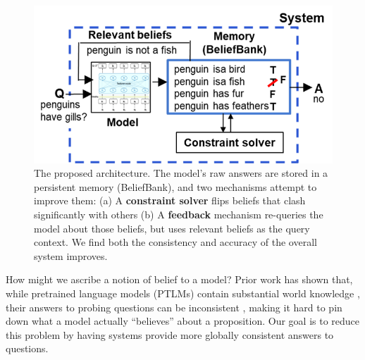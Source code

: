 \documentclass[11pt]{article}
\newcommand{\nk}[1]{\textcolor{green}{Nora: #1}}
\begin{document}
\begin{figure}[t]
\centering
     \includegraphics[width=1\columnwidth]{architecture2.png}	   %
\caption{The proposed architecture. The model's raw answers are stored in a
persistent memory (BeliefBank), and two mechanisms attempt to improve them:
(a) A {\bf constraint solver} flips beliefs that clash significantly with others
(b) A {\bf feedback} mechanism re-queries the model about those beliefs, but
uses relevant beliefs as the query context. We find both the consistency and accuracy
of the overall system improves. \label{architecture}}
\end{figure}

How might we ascribe a notion of belief to a model? Prior work has shown that, while
pretrained language models (PTLMs) contain substantial world knowledge \cite{Petroni2019LanguageMA, roberts-etal-2020-much},
their answers to probing questions can be inconsistent \cite{Elazar2021MeasuringAI, ravichander-etal-2020-systematicity, Kassner2020NegatedAM},
making it hard to pin down what a model actually ``believes'' about a proposition.
Our goal is to reduce this problem by having systems provide more globally consistent
answers to questions.
\end{document}
